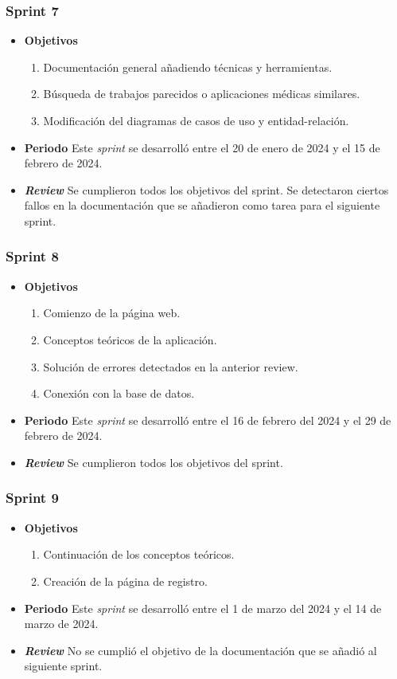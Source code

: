 \subsubsection{Sprint 7}
\begin{itemize}
\item \textbf{Objetivos}
\begin{enumerate}
\item Documentación general añadiendo técnicas y herramientas.
\item Búsqueda de trabajos parecidos o aplicaciones médicas similares.
\item Modificación del diagramas de casos de uso y entidad-relación.
\end{enumerate}
\item \textbf{Periodo}
Este \textsl{sprint} se desarrolló entre el 20 de enero de 2024 y el 15 de febrero de 2024.
\item \textbf{\textsl{Review}}
Se cumplieron todos los objetivos del sprint. Se detectaron ciertos fallos en la documentación que se añadieron como tarea para el siguiente sprint. 


\end{itemize}
\subsubsection{Sprint 8}
\begin{itemize}
\item \textbf{Objetivos}
\begin{enumerate}
\item Comienzo de la página web.
\item Conceptos teóricos de la aplicación.
\item Solución de errores detectados en la anterior review.
\item Conexión con la base de datos.
\end{enumerate}
\item \textbf{Periodo}
Este \textsl{sprint} se desarrolló entre el 16 de febrero del 2024 y el 29 de febrero de 2024.
\item \textbf{\textsl{Review}}
Se cumplieron todos los objetivos del sprint. 
\end{itemize}

\subsubsection{Sprint 9}
\begin{itemize}
\item \textbf{Objetivos}
\begin{enumerate}
\item Continuación de los conceptos teóricos.
\item Creación de la página de registro.
\end{enumerate}
\item \textbf{Periodo}
Este \textsl{sprint} se desarrolló entre el 1 de marzo del 2024 y el 14 de marzo de 2024.
\item \textbf{\textsl{Review}}
No se cumplió el objetivo de la documentación que se añadió al siguiente sprint. 
\end{itemize}
